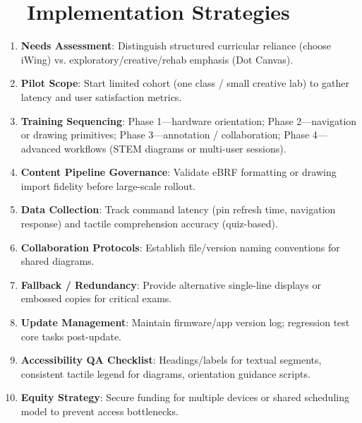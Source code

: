 \section{~~Implementation Strategies}
\label{sec:sr29-implementation}
\begin{enumerate}
	\item \textbf{Needs Assessment}: Distinguish structured curricular reliance (choose iWing) vs. exploratory/creative/rehab emphasis (Dot Canvas).
	\item \textbf{Pilot Scope}: Start limited cohort (one class / small creative lab) to gather latency and user satisfaction metrics.
	\item \textbf{Training Sequencing}: Phase 1—hardware orientation; Phase 2—navigation or drawing primitives; Phase 3—annotation / collaboration; Phase 4—advanced workflows (STEM diagrams or multi-user sessions).
	\item \textbf{Content Pipeline Governance}: Validate eBRF formatting or drawing import fidelity before large-scale rollout.
	\item \textbf{Data Collection}: Track command latency (pin refresh time, navigation response) and tactile comprehension accuracy (quiz-based).
	\item \textbf{Collaboration Protocols}: Establish file/version naming conventions for shared diagrams.
	\item \textbf{Fallback / Redundancy}: Provide alternative single-line displays or embossed copies for critical exams.
	\item \textbf{Update Management}: Maintain firmware/app version log; regression test core tasks post-update.
	\item \textbf{Accessibility QA Checklist}: Headings/labels for textual segments, consistent tactile legend for diagrams, orientation guidance scripts.
	\item \textbf{Equity Strategy}: Secure funding for multiple devices or shared scheduling model to prevent access bottlenecks.
\end{enumerate}

